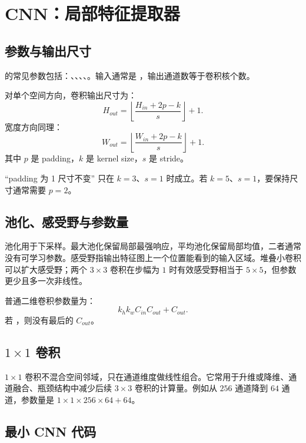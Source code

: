 \section{CNN：局部特征提取器}

\subsection{ 参数与输出尺寸}

 的常见参数包括：、、、、。输入通常是 \code{[N, C, H, W]}，输出通道数等于卷积核个数。

对单个空间方向，卷积输出尺寸为：
\[
H_{out}=\left\lfloor \frac{H_{in}+2p-k}{s} \right\rfloor +1.
\]
宽度方向同理：
\[
W_{out}=\left\lfloor \frac{W_{in}+2p-k}{s} \right\rfloor +1.
\]
其中 \(p\) 是 padding，\(k\) 是 kernel size，\(s\) 是 stride。

\begin{trap}
``padding 为 1 尺寸不变'' 只在 \(k=3\)、\(s=1\) 时成立。若 \(k=5\)、\(s=1\)，要保持尺寸通常需要 \(p=2\)。
\end{trap}

\subsection{池化、感受野与参数量}

池化用于下采样。最大池化保留局部最强响应，平均池化保留局部均值，二者通常没有可学习参数。感受野指输出特征图上一个位置能看到的输入区域。堆叠小卷积可以扩大感受野；两个 \(3\times 3\) 卷积在步幅为 \(1\) 时有效感受野相当于 \(5\times 5\)，但参数更少且多一次非线性。

普通二维卷积参数量为：
\[
k_h k_w C_{in} C_{out}+C_{out}.
\]
若 ，则没有最后的 \(C_{out}\)。

\subsection{\(1\times 1\) 卷积}

\(1\times 1\) 卷积不混合空间邻域，只在通道维度做线性组合。它常用于升维或降维、通道融合、瓶颈结构中减少后续 \(3\times 3\) 卷积的计算量。例如从 \(256\) 通道降到 \(64\) 通道，参数量是 \(1\times 1\times 256\times 64+64\)。

\subsection{最小 CNN 代码}

